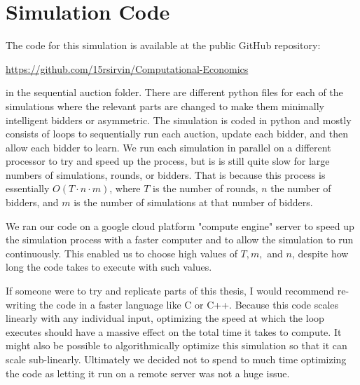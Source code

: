 \documentclass[12pt,twoside]{reedthesis}
\begin{document}
      \chapter{Simulation Code}
      The code for this simulation is available at the public GitHub repository:
      \begin{center}
      	\url{https://github.com/15rsirvin/Computational-Economics}
      \end{center}
      in the sequential auction folder. 
      There are different python files for each of the simulations where the relevant parts are changed to make them minimally intelligent bidders or asymmetric. The simulation is coded in python and mostly consists of loops to sequentially run each auction, update each bidder, and then allow each bidder to learn. We run each simulation in parallel on a different processor to try and speed up the process, but is is still quite slow for large numbers of simulations, rounds, or bidders. That is because this process is essentially $O(T \cdot n \cdot m)$, where $T$ is the number of rounds, $n$ the number of bidders, and $m$ is the number of simulations at that number of bidders. 
      
      We ran our code on a google cloud platform "compute engine" server to speed up the simulation process with a faster computer and to allow the simulation to run continuously. This enabled us to choose high values of $T, m,$ and $n$, despite how long the code takes to execute with such values.  
      
      If someone were to try and replicate parts of this thesis, I would recommend re-writing the code in a faster language like C or C++. Because this code scales linearly with any individual input, optimizing the speed at which the loop executes should have a massive effect on the total time it takes to compute. It might also be possible to algorithmically optimize this simulation so that it can scale sub-linearly. Ultimately we decided not to spend to much time optimizing the code as letting it run on a remote server was not a huge issue.
      


  \backmatter %

    \nocite{*}


%  
 

\end{document}
